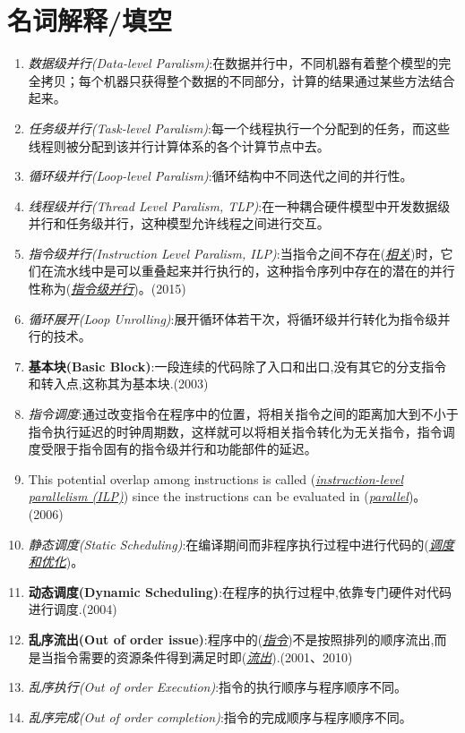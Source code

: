 \documentclass[a4paper]{ctexbook}
\newcommand{\blank}[1]{(\emph{\underline{#1}})}
\begin{document}
\section{名词解释/填空}
\begin{enumerate}
  \item \emph{数据级并行(Data-level Paralism)}:在数据并行中，不同机器有着整个模型的完全拷贝；每个机器只获得整个数据的不同部分，计算的结果通过某些方法结合起来。
  \item \emph{任务级并行(Task-level Paralism)}:每一个线程执行一个分配到的任务，而这些线程则被分配到该并行计算体系的各个计算节点中去。
  \item \emph{循环级并行(Loop-level Paralism)}:循环结构中不同迭代之间的并行性。
  \item \emph{线程级并行(Thread Level Paralism, TLP)}:在一种耦合硬件模型中开发数据级并行和任务级并行，这种模型允许线程之间进行交互。
  \item \emph{指令级并行(Instruction Level Paralism, ILP)}:当指令之间不存在\blank{相关}时，它们在流水线中是可以重叠起来并行执行的，这种指令序列中存在的潜在的并行性称为\blank{指令级并行}。(2015)
  \item \emph{循环展开(Loop Unrolling)}:展开循环体若干次，将循环级并行转化为指令级并行的技术。
  \item \textbf{基本块(Basic Block)}:一段连续的代码除了入口和出口,没有其它的分支指令和转入点,这称其为基本块.(2003)
  \item \emph{指令调度}:通过改变指令在程序中的位置，将相关指令之间的距离加大到不小于指令执行延迟的时钟周期数，这样就可以将相关指令转化为无关指令，指令调度受限于指令固有的指令级并行和功能部件的延迟。
  \item This potential overlap among instructions is called (\emph{\underline{instruction-level parallelism (ILP)}}) since the instructions can be evaluated in (\emph{\underline{parallel}})。(2006)
  \item \emph{静态调度(Static Scheduling)}:在编译期间而非程序执行过程中进行代码的\blank{调度和优化}。
  \item \textbf{动态调度(Dynamic Scheduling)}:在程序的执行过程中,依靠专门硬件对代码进行调度.(2004)
  \item \textbf{乱序流出(Out of order issue)}:程序中的\blank{指令}不是按照排列的顺序流出,而是当指令需要的资源条件得到满足时即\blank{流出}.(2001、2010)
  \item \emph{乱序执行(Out of order Execution)}:指令的执行顺序与程序顺序不同。
  \item \emph{乱序完成(Out of order completion)}:指令的完成顺序与程序顺序不同。

\end{enumerate}
\end{document}
